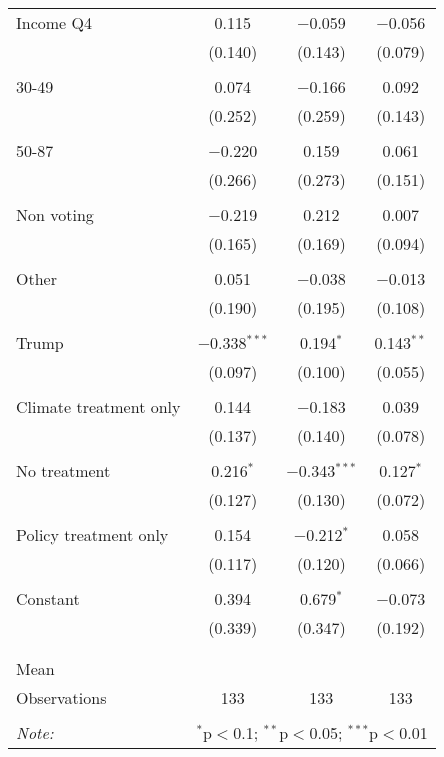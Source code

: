\begin{tabular}{@{\extracolsep{5pt}}lccc}
 Income Q4 & 0.115 & $-$0.059 & $-$0.056 \\ 
  & (0.140) & (0.143) & (0.079) \\ 
  & & & \\ 
 30-49 & 0.074 & $-$0.166 & 0.092 \\ 
  & (0.252) & (0.259) & (0.143) \\ 
  & & & \\ 
 50-87 & $-$0.220 & 0.159 & 0.061 \\ 
  & (0.266) & (0.273) & (0.151) \\ 
  & & & \\ 
 Non voting & $-$0.219 & 0.212 & 0.007 \\ 
  & (0.165) & (0.169) & (0.094) \\ 
  & & & \\ 
 Other & 0.051 & $-$0.038 & $-$0.013 \\ 
  & (0.190) & (0.195) & (0.108) \\ 
  & & & \\ 
 Trump & $-$0.338$^{***}$ & 0.194$^{*}$ & 0.143$^{**}$ \\ 
  & (0.097) & (0.100) & (0.055) \\ 
  & & & \\ 
 Climate treatment only & 0.144 & $-$0.183 & 0.039 \\ 
  & (0.137) & (0.140) & (0.078) \\ 
  & & & \\ 
 No treatment & 0.216$^{*}$ & $-$0.343$^{***}$ & 0.127$^{*}$ \\ 
  & (0.127) & (0.130) & (0.072) \\ 
  & & & \\ 
 Policy treatment only & 0.154 & $-$0.212$^{*}$ & 0.058 \\ 
  & (0.117) & (0.120) & (0.066) \\ 
  & & & \\ 
 Constant & 0.394 & 0.679$^{*}$ & $-$0.073 \\ 
  & (0.339) & (0.347) & (0.192) \\ 
  & & & \\ 
\hline \\[-1.8ex] 
Mean &  &  &  \\ 
Observations & 133 & 133 & 133 \\ 
\hline 
\hline \\[-1.8ex] 
\textit{Note:}  & \multicolumn{3}{r}{$^{*}$p$<$0.1; $^{**}$p$<$0.05; $^{***}$p$<$0.01} \\ 
\end{tabular} 
